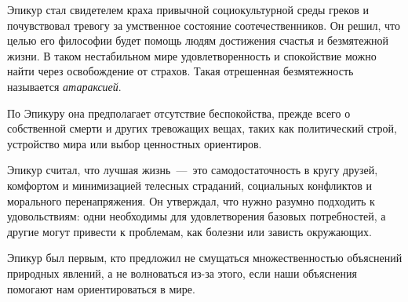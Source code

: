 Эпикур стал свидетелем краха привычной социокультурной среды греков и почувствовал тревогу за умственное состояние соотечественников. Он решил, что целью его философии будет помощь людям достижения счастья и безмятежной жизни. В таком нестабильном мире удовлетворенность и спокойствие можно найти через освобождение от страхов. Такая отрешенная безмятежность называется \textit{атараксией}. 

По Эпикуру она предполагает отсутствие беспокойства, прежде всего о собственной смерти и других тревожащих вещах, таких как политический строй, устройство мира или выбор ценностных ориентиров. 

Эпикур считал, что лучшая жизнь~---~это самодостаточность в кругу друзей, комфортом и минимизацией телесных страданий, социальных конфликтов и морального перенапряжения.  Он утверждал, что нужно разумно подходить к удовольствиям: одни необходимы для удовлетворения базовых потребностей, а другие могут привести к проблемам, как болезни или зависть окружающих. 

Эпикур был первым, кто предложил не смущаться множественностью объяснений природных явлений, а не волноваться из-за этого, если наши объяснения помогают нам ориентироваться в мире.





